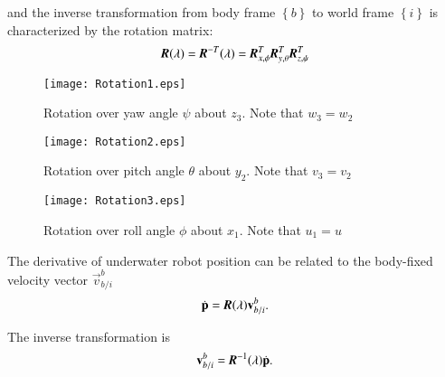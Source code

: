 and the inverse transformation from body frame $\left\{ b \right\}$ to world frame $\left\{ i \right\}$ is characterized by the rotation matrix:
\begin{align}
\emph{\textbf{R}}(\vec{\lambda})=\emph{\textbf{R}}^{-T}(\vec{\lambda})=\emph{\textbf{R}}_{x, \phi}^{T}\emph{\textbf{R}}_{y, \theta}^{T}\emph{\textbf{R}}_{z, \psi}^{T}
\end{align}
\begin{figure}
\centering
\texttt{[image: Rotation1.eps]}
\caption{Rotation over yaw angle $\psi$ about $z_{3}$. Note that $w_{3}=w_{2}$}	
\label{FIG:Rotation1}
\end{figure}
\begin{figure}
\centering
\texttt{[image: Rotation2.eps]}
\caption{Rotation over pitch angle $\theta$ about $y_{2}$. Note that $v_{3}=v_{2}$}	
\label{FIG:Rotation2}
\end{figure}
\begin{figure}
\centering
\texttt{[image: Rotation3.eps]}
\caption{Rotation over roll angle $\phi$ about $x_{1}$. Note that $u_{1}=u$}	
\label{FIG:Rotation3}
\end{figure}

The derivative of underwater robot position can be related to the body-fixed velocity vector $\vec{v}^{b}_{b/i}$
\begin{align}
\dot{\vec{p}}=\emph{\textbf{R}}(\vec{\lambda})\vec{v}^{b}_{b/i}.
\end{align}

The inverse transformation is 
\begin{align}
\vec{v}^{b}_{b/i}=\emph{\textbf{R}}^{-1}(\vec{\lambda})\dot{\vec{p}}.
\end{align}

